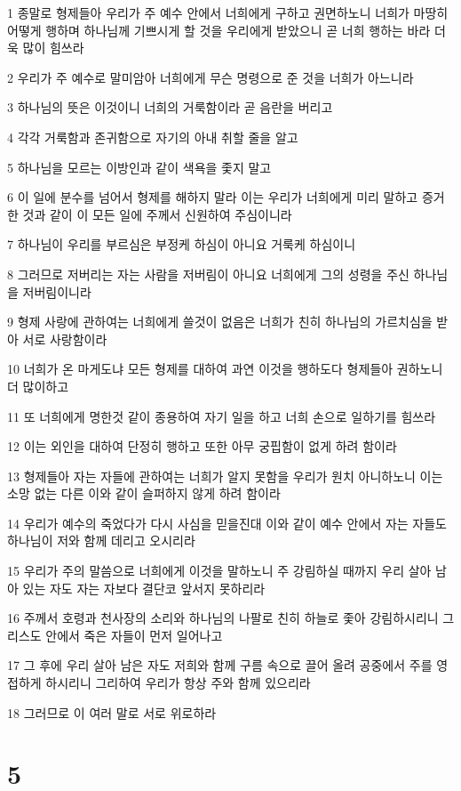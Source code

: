 \par 1 종말로 형제들아 우리가 주 예수 안에서 너희에게 구하고 권면하노니 너희가 마땅히 어떻게 행하며 하나님께 기쁘시게 할 것을 우리에게 받았으니 곧 너희 행하는 바라 더욱 많이 힘쓰라
\par 2 우리가 주 예수로 말미암아 너희에게 무슨 명령으로 준 것을 너희가 아느니라
\par 3 하나님의 뜻은 이것이니 너희의 거룩함이라 곧 음란을 버리고
\par 4 각각 거룩함과 존귀함으로 자기의 아내 취할 줄을 알고
\par 5 하나님을 모르는 이방인과 같이 색욕을 좇지 말고
\par 6 이 일에 분수를 넘어서 형제를 해하지 말라 이는 우리가 너희에게 미리 말하고 증거한 것과 같이 이 모든 일에 주께서 신원하여 주심이니라
\par 7 하나님이 우리를 부르심은 부정케 하심이 아니요 거룩케 하심이니
\par 8 그러므로 저버리는 자는 사람을 저버림이 아니요 너희에게 그의 성령을 주신 하나님을 저버림이니라
\par 9 형제 사랑에 관하여는 너희에게 쓸것이 없음은 너희가 친히 하나님의 가르치심을 받아 서로 사랑함이라
\par 10 너희가 온 마게도냐 모든 형제를 대하여 과연 이것을 행하도다 형제들아 권하노니 더 많이하고
\par 11 또 너희에게 명한것 같이 종용하여 자기 일을 하고 너희 손으로 일하기를 힘쓰라
\par 12 이는 외인을 대하여 단정히 행하고 또한 아무 궁핍함이 없게 하려 함이라
\par 13 형제들아 자는 자들에 관하여는 너희가 알지 못함을 우리가 원치 아니하노니 이는 소망 없는 다른 이와 같이 슬퍼하지 않게 하려 함이라
\par 14 우리가 예수의 죽었다가 다시 사심을 믿을진대 이와 같이 예수 안에서 자는 자들도 하나님이 저와 함께 데리고 오시리라
\par 15 우리가 주의 말씀으로 너희에게 이것을 말하노니 주 강림하실 때까지 우리 살아 남아 있는 자도 자는 자보다 결단코 앞서지 못하리라
\par 16 주께서 호령과 천사장의 소리와 하나님의 나팔로 친히 하늘로 좇아 강림하시리니 그리스도 안에서 죽은 자들이 먼저 일어나고
\par 17 그 후에 우리 살아 남은 자도 저희와 함께 구름 속으로 끌어 올려 공중에서 주를 영접하게 하시리니 그리하여 우리가 항상 주와 함께 있으리라
\par 18 그러므로 이 여러 말로 서로 위로하라

\chapter{5}

